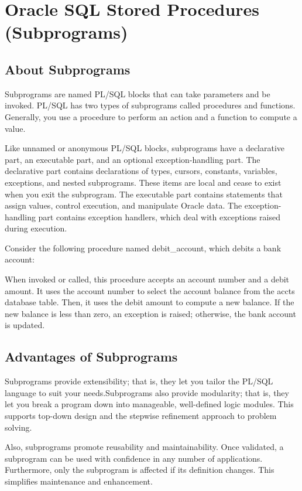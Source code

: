 \section{Oracle SQL Stored Procedures (Subprograms)}
\subsection{About Subprograms}
Subprograms are named PL/SQL blocks that can take parameters and be invoked. PL/SQL has two types of subprograms called procedures and functions. Generally, you use a procedure to perform an action and a function to compute a value.

Like unnamed or anonymous PL/SQL blocks, subprograms have a declarative part, an executable part, and an optional exception-handling part. The declarative part contains declarations of types, cursors, constants, variables, exceptions, and nested subprograms. These items are local and cease to exist when you exit the subprogram. The executable part contains statements that assign values, control execution, and manipulate Oracle data. The exception-handling part contains exception handlers, which deal with exceptions raised during execution.

Consider the following procedure named debit\_account, which debits a bank account:



When invoked or called, this procedure accepts an account number and a debit amount. It uses the account number to select the account balance from the accts database table. Then, it uses the debit amount to compute a new balance. If the new balance is less than zero, an exception is raised; otherwise, the bank account is updated.

\subsection{Advantages of Subprograms}
Subprograms provide extensibility; that is, they let you tailor the PL/SQL language to suit your needs.Subprograms also provide modularity; that is, they let you break a program down into manageable, well-defined logic modules. This supports top-down design and the stepwise refinement approach to problem solving.

Also, subprograms promote reusability and maintainability. Once validated, a subprogram can be used with confidence in any number of applications. Furthermore, only the subprogram is affected if its definition changes. This simplifies maintenance and enhancement.

